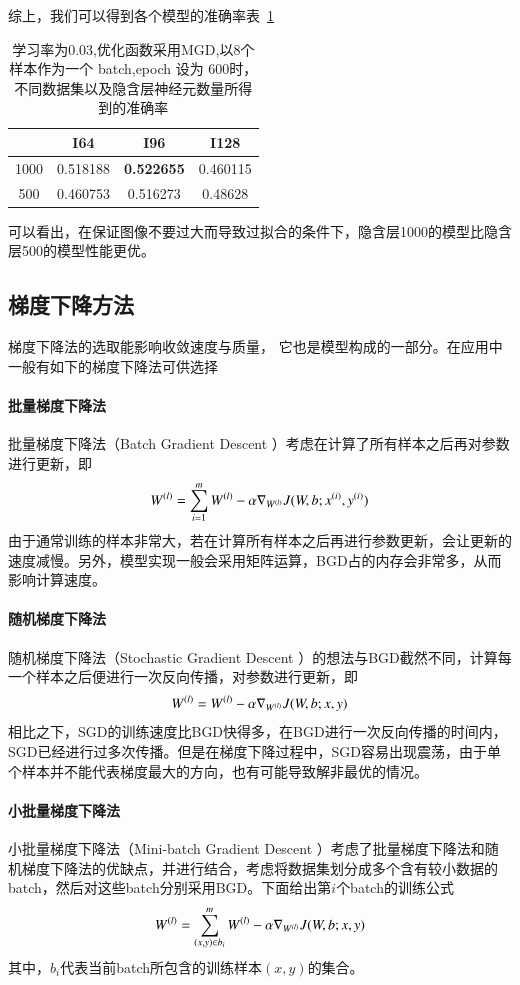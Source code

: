 综上，我们可以得到各个模型的准确率表~\ref{table:bp1}
\begin{table}[htb]
\centering
\caption{学习率为0.03,优化函数采用MGD,以8个样本作为一个 batch,epoch 设为 600时，不同数据集以及隐含层神经元数量所得到的准确率}
\begin{tabular}{cccc}
\toprule[2pt]
\  & I64 & I96 & I128 \\ 
\midrule[1pt]
1000 & 0.518188 & \textbf{0.522655} & 0.460115 \\ 
500 & 0.460753 & 0.516273 & 0.48628 \\ 
\bottomrule[2pt]
\end{tabular} 
\label{table:bp1} 
\end{table}
可以看出，在保证图像不要过大而导致过拟合的条件下，隐含层1000的模型比隐含层500的模型性能更优。

\subsection{梯度下降方法}
梯度下降法的选取能影响收敛速度与质量，	它也是模型构成的一部分。在应用中一般有如下的梯度下降法可供选择
\paragraph{批量梯度下降法}
批量梯度下降法（Batch Gradient Descent ）考虑在计算了所有样本之后再对参数进行更新，即
\begin{eqnarray}
{W}^{({l})}=\sum_{i=1}^m{W}^{({l})}-\alpha\nabla_{{W}^{({l})}}J(W,b;{x}^{({i})},{y}^{({i})})
\end{eqnarray} 
由于通常训练的样本非常大，若在计算所有样本之后再进行参数更新，会让更新的速度减慢。另外，模型实现一般会采用矩阵运算，BGD占的内存会非常多，从而影响计算速度。
\paragraph{随机梯度下降法}
随机梯度下降法（Stochastic Gradient Descent ）的想法与BGD截然不同，计算每一个样本之后便进行一次反向传播，对参数进行更新，即
\begin{eqnarray}
{W}^{({l})}={W}^{({l})}-\alpha\nabla_{{W}^{({l})}}J(W,b;x,y)
\end{eqnarray}
相比之下，SGD的训练速度比BGD快得多，在BGD进行一次反向传播的时间内，SGD已经进行过多次传播。但是在梯度下降过程中，SGD容易出现震荡，由于单个样本并不能代表梯度最大的方向，也有可能导致解非最优的情况。
\paragraph{小批量梯度下降法}
小批量梯度下降法（Mini-batch Gradient Descent ）考虑了批量梯度下降法和随机梯度下降法的优缺点，并进行结合，考虑将数据集划分成多个含有较小数据的batch，然后对这些batch分别采用BGD。下面给出第$i$个batch的训练公式
\begin{eqnarray}
{W}^{({l})}=\sum_{(x,y)\in b_i}^m{W}^{({l})}-\alpha\nabla_{{W}^{({l})}}J(W,b;x,y)
\end{eqnarray}
其中，$b_i$代表当前batch所包含的训练样本$(x,y)$的集合。
